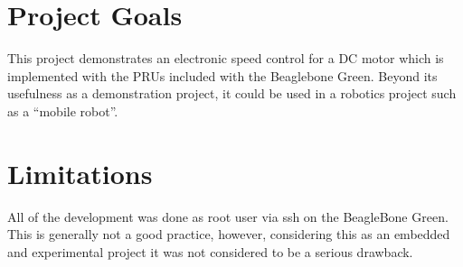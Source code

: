 
\section{Project Goals}

This project demonstrates an electronic speed control for a DC motor which is implemented with the PRUs included with the Beaglebone Green.  Beyond its usefulness as a demonstration project, it could be used in a robotics project such as a ``mobile robot''.


\section{Limitations}



All of the development was done as root user via ssh on the BeagleBone Green.  This is generally not a good practice, however, considering this as an embedded and experimental project it was not considered to be a serious drawback.


